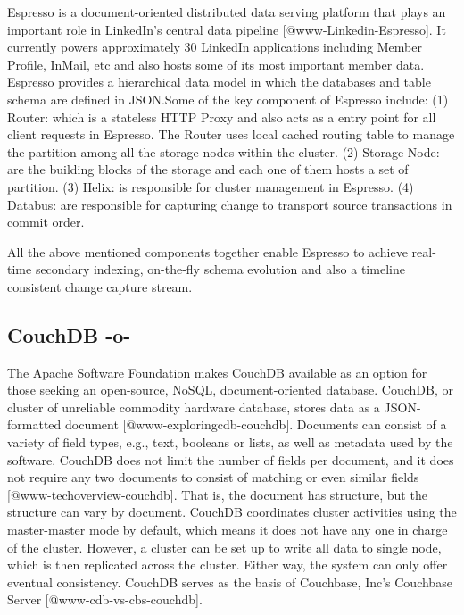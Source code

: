 Espresso is a document-oriented distributed data serving platform that
plays an important role in LinkedIn's central data pipeline
[@www-Linkedin-Espresso].  It currently powers approximately 30
LinkedIn applications including Member Profile, InMail, etc and also
hosts some of its most important member data. Espresso provides a
hierarchical data model in which the databases and table schema are
defined in JSON.Some of the key component of Espresso include: (1)
Router: which is a stateless HTTP Proxy and also acts as a entry point
for all client requests in Espresso. The Router uses local cached
routing table to manage the partition among all the storage nodes
within the cluster. (2) Storage Node: are the building blocks of the
storage and each one of them hosts a set of partition. (3) Helix: is
responsible for cluster management in Espresso. (4) Databus: are
responsible for capturing change to transport source transactions in
commit order.

All the above mentioned components together enable Espresso to achieve
real-time secondary indexing, on-the-fly schema evolution and also a
timeline consistent change capture stream.



\subsection{CouchDB -o-}
     
The Apache Software Foundation makes CouchDB available as an option
for those seeking an open-source, NoSQL, document-oriented
database. CouchDB, or cluster of unreliable commodity hardware
database, stores data as a JSON-formatted document
[@www-exploringcdb-couchdb].  Documents can consist of a variety
of field types, e.g., text, booleans or lists, as well as metadata
used by the software. CouchDB does not limit the number of fields per
document, and it does not require any two documents to consist of
matching or even similar fields
[@www-techoverview-couchdb]. That is, the document has
structure, but the structure can vary by document.  CouchDB
coordinates cluster activities using the master-master mode by
default, which means it does not have any one in charge of the
cluster.  However, a cluster can be set up to write all data to single
node, which is then replicated across the cluster.  Either way, the
system can only offer eventual consistency. CouchDB serves as the
basis of Couchbase, Inc's Couchbase Server
[@www-cdb-vs-cbs-couchdb].



